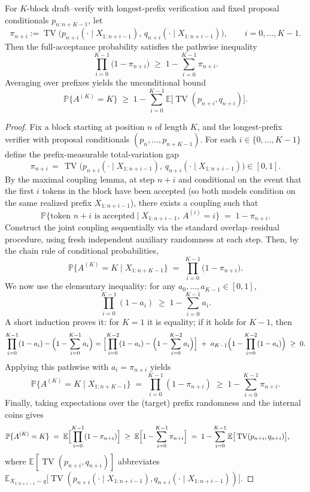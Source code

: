 \begin{proposition}\label{prop:block-tv-lower}
For $K$-block draft--verify with longest-prefix verification and fixed proposal conditionals $p_{n:n+K-1}$, let
\[
\pi_{n+i} := \operatorname{TV}\big(p_{n+i}(\cdot\mid X_{1:n+i-1}),\, q_{n+i}(\cdot\mid X_{1:n+i-1})\big),\qquad i=0,\dots,K-1.
\]
Then the full-acceptance probability satisfies the pathwise inequality
\[
\prod_{i=0}^{K-1}\bigl(1-\pi_{n+i}\bigr)\;\ge\; 1-\sum_{i=0}^{K-1}\pi_{n+i}.
\]
Averaging over prefixes yields the unconditional bound
\[
\mathbb{P}\{A^{(K)}=K\}\;\ge\;1-\sum_{i=0}^{K-1}\mathbb{E}\big[\operatorname{TV}(p_{n+i},q_{n+i})\big].
\]
\end{proposition}

\begin{proof}
Fix a block starting at position $n$ of length $K$, and the longest-prefix verifier with proposal conditionals $(p_{n},\dots,p_{n+K-1})$. For each $i\in\{0,\dots,K-1\}$ define the prefix-measurable total-variation gap
\[
\pi_{n+i} \,=\, \operatorname{TV}\big(p_{n+i}(\cdot\mid X_{1:n+i-1}),\, q_{n+i}(\cdot\mid X_{1:n+i-1})\big)\in[0,1].
\]
By the maximal coupling lemma, at step $n+i$ and conditional on the event that the first $i$ tokens in the block have been accepted (so both models condition on the same realized prefix $X_{1:n+i-1}$), there exists a coupling such that
\[
\mathbb{P}\{\text{token }n+i\text{ is accepted}\mid X_{1:n+i-1},\, A^{(i)}=i\}\;=\;1-\pi_{n+i}.
\]
Construct the joint coupling sequentially via the standard overlap--residual procedure, using fresh independent auxiliary randomness at each step. Then, by the chain rule of conditional probabilities,
\[
\mathbb{P}\{A^{(K)}=K\mid X_{1:n+K-1}\}\;=\;\prod_{i=0}^{K-1}\bigl(1-\pi_{n+i}\bigr).
\]
We now use the elementary inequality: for any $a_0,\dots,a_{K-1}\in[0,1]$,
\[
\prod_{i=0}^{K-1}(1-a_i)\;\ge\;1-\sum_{i=0}^{K-1}a_i.
\]
A short induction proves it: for $K=1$ it is equality; if it holds for $K-1$, then
\[
\prod_{i=0}^{K-1}(1-a_i) - \Bigl(1-\sum_{i=0}^{K-1}a_i\Bigr)
= \Bigl[\prod_{i=0}^{K-2}(1-a_i) - \Bigl(1-\sum_{i=0}^{K-2}a_i\Bigr)\Bigr] 
\; +\; a_{K-1}\Bigl(1-\prod_{i=0}^{K-2}(1-a_i)\Bigr)\;\ge\;0.
\]
Applying this pathwise with $a_i=\pi_{n+i}$ yields
\[
\mathbb{P}\{A^{(K)}=K\mid X_{1:n+K-1}\}\;=\;\prod_{i=0}^{K-1}(1-\pi_{n+i})\;\ge\;1-\sum_{i=0}^{K-1}\pi_{n+i}.
\]
Finally, taking expectations over the (target) prefix randomness and the internal coins gives
\[
\mathbb{P}\{A^{(K)}=K\}\;=\;\mathbb{E}\Bigl[\prod_{i=0}^{K-1}(1-\pi_{n+i})\Bigr]
\;\ge\;\mathbb{E}\Bigl[1-\sum\limits_{i=0}^{K-1}\pi_{n+i}\Bigr]
\;=\;1-\sum_{i=0}^{K-1}\mathbb{E}\big[\operatorname{TV}(p_{n+i},q_{n+i})\big],\qquad \qedhere
\]
where $\mathbb{E}[\operatorname{TV}(p_{n+i},q_{n+i})]$ abbreviates $\mathbb{E}_{X_{1:n+i-1}\sim q}\big[\operatorname{TV}(p_{n+i}(\cdot\mid X_{1:n+i-1}),q_{n+i}(\cdot\mid X_{1:n+i-1}))\big]$.
\end{proof}
